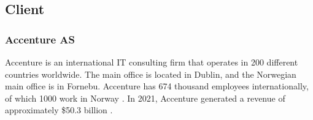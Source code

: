 \subsection{Client}
\subsubsection*{Accenture AS}

Accenture is an international IT consulting firm that operates in 200 different countries worldwide. The main office is located in Dublin, and the Norwegian main office is in Fornebu. Accenture has 674 thousand employees internationally, of which 1000 work in Norway \parencite{accenture_earning_report_2021}. In 2021, Accenture generated a revenue of approximately \$50.3 billion \parencite{accenture_about}.
